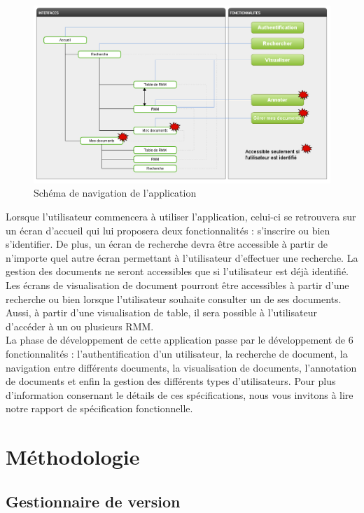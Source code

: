 \documentclass[a4paper]{article}
\begin{document}
\begin{figure}[H]
\centering
\includegraphics[width=\textwidth]{navigation.png}
\caption{Schéma de navigation de l'application}
\label{fig:navigation}
\end{figure}

	Lorsque l’utilisateur commencera à utiliser l’application, celui-ci se retrouvera sur un écran d’accueil qui lui proposera deux fonctionnalités : s'inscrire ou bien s’identifier. De plus, un écran de recherche devra être accessible à partir de n’importe quel autre écran permettant à l'utilisateur d'effectuer une recherche. La gestion des documents ne seront accessibles que si l’utilisateur est déjà identifié. Les écrans de visualisation de document pourront être accessibles à partir d’une recherche ou bien lorsque l’utilisateur souhaite consulter un de ses documents. Aussi, à partir d’une visualisation de table, il sera possible à l’utilisateur d’accéder à un ou plusieurs RMM.\\
	
	La phase de développement de cette application passe par le développement de 6 fonctionnalités : l'authentification d'un utilisateur, la recherche de document, la navigation entre différents documents, la visualisation de documents, l'annotation de documents et enfin la gestion des différents types d'utilisateurs. Pour plus d'information consernant le détails de ces spécifications, nous vous invitons à lire notre rapport de spécification fonctionnelle.\\
	
\section{Méthodologie}

	\subsection{Gestionnaire de version}
\end{document}
